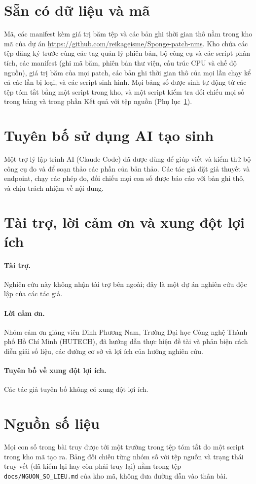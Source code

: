 \documentclass[a4paper,fleqn]{cas-dc}
\begin{document}
\section*{Sẵn có dữ liệu và mã}
Mã, các manifest kèm giá trị băm tệp và các bản ghi thời gian thô nằm trong kho mã của dự án \url{https://github.com/reikageisme/Sponge-patch-nms}. Kho chứa các tệp đăng ký trước cùng các tag quản lý phiên bản, bộ công cụ và các script phân tích, các manifest (ghi mã băm, phiên bản thư viện, cấu trúc CPU và chế độ nguồn), giá trị băm của mọi patch, các bản ghi thời gian thô của mọi lần chạy kể cả các lần bị loại, và các script sinh hình. Mọi bảng số được sinh tự động từ các tệp tóm tắt bằng một script trong kho, và một script kiểm tra đối chiếu mọi số trong bảng và trong phần Kết quả với tệp nguồn (Phụ lục~\ref{app:src}).

\section*{Tuyên bố sử dụng AI tạo sinh}
Một trợ lý lập trình AI (Claude Code) đã được dùng để giúp viết và kiểm thử bộ công cụ đo và để soạn thảo các phần của bản thảo. Các tác giả đặt giả thuyết và endpoint, chạy các phép đo, đối chiếu mọi con số được báo cáo với bản ghi thô, và chịu trách nhiệm về nội dung.

\section*{Tài trợ, lời cảm ơn và xung đột lợi ích}
\paragraph{Tài trợ.} Nghiên cứu này không nhận tài trợ bên ngoài; đây là một dự án nghiên cứu độc lập của các tác giả.
\paragraph{Lời cảm ơn.} Nhóm cảm ơn giảng viên Đinh Phương Nam, Trường Đại học Công nghệ Thành phố Hồ Chí Minh (HUTECH), đã hướng dẫn thực hiện đề tài và phản biện cách diễn giải số liệu, các đường cơ sở và lợi ích của hướng nghiên cứu.
\paragraph{Tuyên bố về xung đột lợi ích.} Các tác giả tuyên bố không có xung đột lợi ích.

\appendix
\section{Nguồn số liệu}
\label{app:src}
Mọi con số trong bài truy được tới một trường trong tệp tóm tắt do một script trong kho mã tạo ra. Bảng đối chiếu từng nhóm số với tệp nguồn và trạng thái truy vết (đã kiểm lại hay còn phải truy lại) nằm trong tệp \texttt{docs/NGUON\_SO\_LIEU.md} của kho mã, không đưa đường dẫn vào thân bài.



\end{document}
